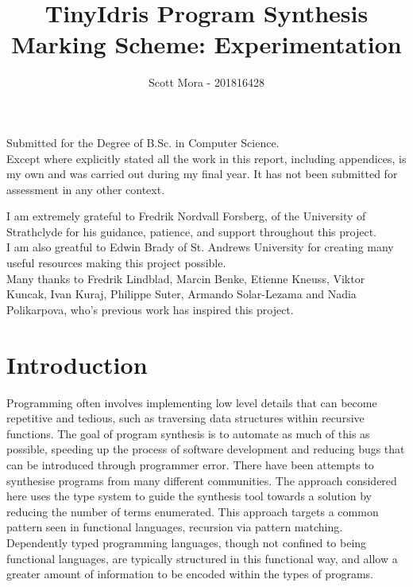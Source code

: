 \documentclass[a4paper]{article}
\author{Scott Mora - 201816428}
\date{}
\title{TinyIdris Program Synthesis\\\medskip
\large Marking Scheme: Experimentation}
\begin{document}
\maketitle
\begin{center}
\vspace{15mm}
Submitted for the Degree of B.Sc. in Computer Science. \\
\vspace{15mm}
Except where explicitly stated all the work in this report, including appendices, is my own and was carried out during my final year. It has not been submitted for assessment in any other context. 
 \end{center}
\clearpage
\tableofcontents
\clearpage

\thispagestyle{empty}
    \null{}
        \begin{center}
          I am extremely grateful to Fredrik Nordvall Forsberg, of
          the University of Strathclyde for his guidance,
          patience, and support throughout this project.\\
\vspace{10mm}
          I am also greatful to Edwin Brady of St. Andrews University
          for creating many useful resources making this project possible. \\
\vspace{10mm}
          Many thanks to Fredrik Lindblad, Marcin Benke, Etienne Kneuss, Viktor Kuncak,
          Ivan Kuraj, Philippe Suter, Armando Solar-Lezama and Nadia Polikarpova,
          who's previous work has inspired this project. 
        \end{center}
\null
\clearpage


\section{Introduction}
\label{sec:orgf1aad56}

Programming often involves implementing low level details that can
become repetitive and tedious, such as traversing data structures
within recursive functions.
The goal of program synthesis is to automate as much of this as
possible, speeding up the process of software development and reducing
bugs that can be introduced through programmer error. There have been
attempts to synthesise programs from many different communities.
The approach considered here uses the type system to guide the synthesis
tool towards a solution by reducing the number of terms enumerated.
This approach targets a common pattern seen in functional languages,
recursion via pattern matching. Dependently typed programming languages, 
though not confined to being functional languages, are typically 
structured in this functional way, and allow a greater amount of 
information to be encoded within the types of programs. 
\end{document}
